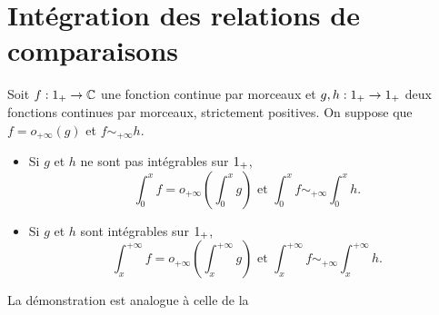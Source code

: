 \section{Intégration des relations de comparaisons}

\begin{prop}{}
    Soit $f: 1_+ \rightarrow \mathbb{C}$ une fonction continue par morceaux et $g, h:1_+ \rightarrow 1_+$ deux fonctions continues par morceaux, strictement positives. On suppose que $f = o_{+\infty}(g)$ et $f \sim_{+\infty} h$.\\
    \begin{itemize}
        \item Si $g$ et $h$ ne sont pas intégrables sur $1_+$,
        $$\int_{0}^{x} f = o_{+\infty} \left(\int_{0}^{x} g \right) \text{ et } \int_{0}^{x} f \sim_{+\infty} \int_{0}^{x} h.$$
        \item Si $g$ et $h$ sont intégrables sur $1_+$,
        $$\int_{x}^{+\infty} f = o_{+\infty} \left(\int_{x}^{+\infty} g \right) \text{ et } \int_{x}^{+\infty} f \sim_{+\infty} \int_{x}^{+\infty} h.$$
    \end{itemize}
\end{prop} 

La démonstration est analogue à celle de la 

